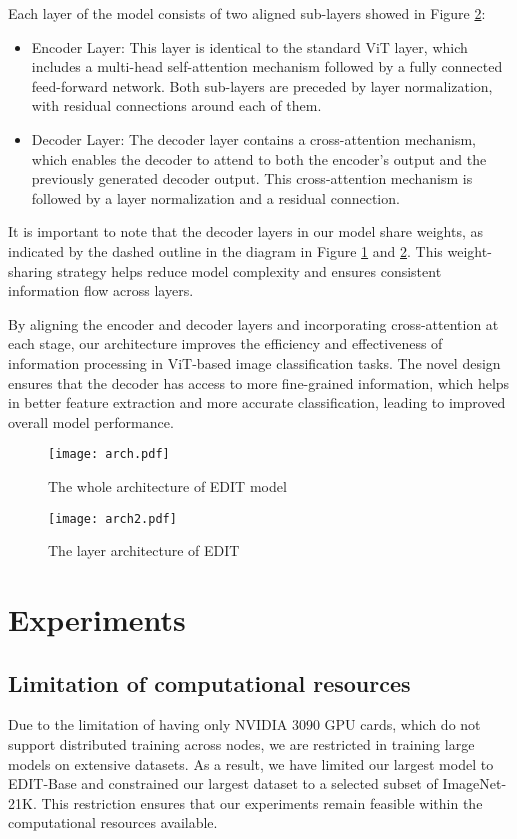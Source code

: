 \documentclass[anon,12pt]{colt2024} %
\begin{document}
Each layer of the model consists of two aligned sub-layers showed in Figure \ref{fig:layer-arch}:
\begin{itemize}
  \item Encoder Layer: This layer is identical to the standard ViT layer, which includes a multi-head self-attention mechanism followed by a fully connected feed-forward network. Both sub-layers are preceded by layer normalization, with residual connections around each of them.
  \item Decoder Layer: The decoder layer contains a cross-attention mechanism, which enables the decoder to attend to both the encoder's output and the previously generated decoder output. This cross-attention mechanism is followed by a layer normalization and a residual connection.
\end{itemize}

It is important to note that the decoder layers in our model share weights, as indicated by the dashed outline in the diagram in Figure \ref{fig:whole-arch} and \ref{fig:layer-arch}. This weight-sharing strategy helps reduce model complexity and ensures consistent information flow across layers.

By aligning the encoder and decoder layers and incorporating cross-attention at each stage, our architecture improves the efficiency and effectiveness of information processing in ViT-based image classification tasks. The novel design ensures that the decoder has access to more fine-grained information, which helps in better feature extraction and more accurate classification, leading to improved overall model performance.


\begin{figure}[h!]
  \centering
  \texttt{[image: arch.pdf]}
  \caption{The whole architecture of EDIT model}\label{fig:whole-arch}
\end{figure}

\begin{figure}[h!]
  \centering
  \texttt{[image: arch2.pdf]}
  \caption{The layer architecture of EDIT}\label{fig:layer-arch}
\end{figure}

\section{Experiments}

\subsection{Limitation of computational resources}
Due to the limitation of having only NVIDIA 3090 GPU cards, which do not support distributed training across nodes, we are restricted in training large models on extensive datasets. As a result, we have limited our largest model to EDIT-Base and constrained our largest dataset to a selected subset of ImageNet-21K. This restriction ensures that our experiments remain feasible within the computational resources available.
\end{document}
